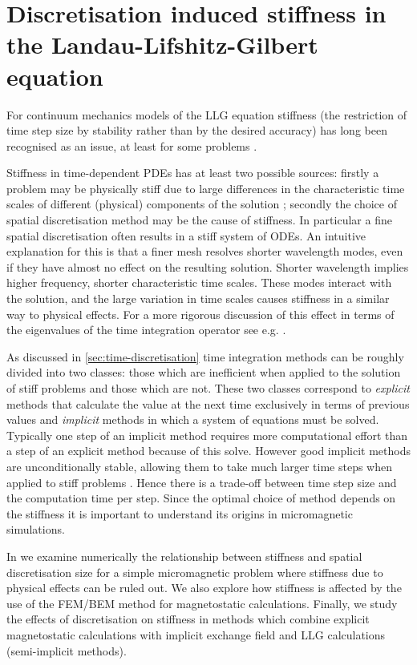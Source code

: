
\chapter{Discretisation induced stiffness in the Landau-Lifshitz-Gilbert equation}
\label{cha:stiffn-llg-equat}


For continuum mechanics models of the LLG equation stiffness (the restriction of time step size by stability rather than by the desired accuracy) has long been recognised as an issue, at least for some problems \cite{Nakatani1989}.

Stiffness in time-dependent PDEs has at least two possible sources:
firstly a problem may be physically stiff due to large differences in the characteristic time scales of different (physical) components of the solution \cite[Chap. 4]{Iserles2009};
secondly the choice of spatial discretisation method may be the cause of stiffness.
In particular a fine spatial discretisation often results in a stiff system of ODEs.
An intuitive explanation for this is that a finer mesh resolves shorter wavelength modes, even if they have almost no effect on the resulting solution.
Shorter wavelength implies higher frequency, \ie shorter characteristic time scales.
These modes interact with the solution, and the large variation in time scales causes stiffness in a similar way to physical effects.
For a more rigorous discussion of this effect in terms of the eigenvalues of the time integration operator see e.g. \cite[Sec 8.2]{Atkinson2009}.

As discussed in \cref{sec:time-discretisation} time integration methods can be roughly divided into two classes: those which are inefficient when applied to the solution of stiff problems and those which are not.
These two classes correspond to \emph{explicit} methods that calculate the value at the next time exclusively in terms of previous values and \emph{implicit} methods in which a system of equations must be solved.
Typically one step of an implicit method requires more computational effort than a step of an explicit method because of this solve.
However good implicit methods are unconditionally stable, allowing them to take much larger time steps when applied to stiff problems \cite[Chap. 4]{Iserles2009}.
Hence there is a trade-off between time step size and the computation time per step.
Since the optimal choice of method depends on the stiffness it is important to understand its origins in micromagnetic simulations.

In  we examine numerically the relationship between stiffness and spatial discretisation size for a simple micromagnetic problem where stiffness due to physical effects can be ruled out.
We also explore how stiffness is affected by the use of the FEM/BEM method for magnetostatic calculations.
Finally, we study the effects of discretisation on stiffness in methods which combine explicit magnetostatic calculations with implicit exchange field and LLG calculations (\ie semi-implicit methods).

